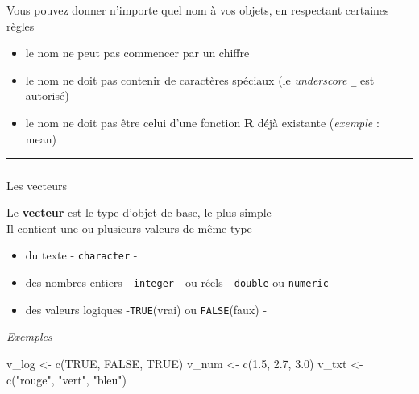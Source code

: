 \documentclass[
  french,
  10pt,
  a4paper,
]{article}
\makeatletter
\let\oldsubparagraph\subparagraph
\renewcommand{\subparagraph}{
    \@ifstar
      \xxxSubParagraphStar
      \xxxSubParagraphNoStar
  }
\newcommand{\xxxSubParagraphStar}[1]{\oldsubparagraph*{#1}\mbox{}}
\newcommand{\xxxSubParagraphNoStar}[1]{\oldsubparagraph{#1}\mbox{}}
\newenvironment{Shaded}{}{}
\newcommand{\ConstantTok}[1]{\textcolor[rgb]{0.60,0.41,0.00}{#1}}
\newcommand{\FloatTok}[1]{\textcolor[rgb]{0.60,0.41,0.00}{#1}}
\newcommand{\FunctionTok}[1]{\textcolor[rgb]{0.25,0.47,0.95}{#1}}
\newcommand{\NormalTok}[1]{\textcolor[rgb]{0.22,0.23,0.26}{#1}}
\newcommand{\OtherTok}[1]{\textcolor[rgb]{0.15,0.68,0.38}{#1}}
\newcommand{\StringTok}[1]{\textcolor[rgb]{0.31,0.63,0.31}{#1}}
\providecommand{\tightlist}{%
  \setlength{\itemsep}{0pt}\setlength{\parskip}{0pt}}
\makeatother
\begin{document}
\begin{tcolorbox}[enhanced jigsaw, arc=.35mm, bottomrule=.15mm, bottomtitle=1mm, breakable, colback=white, colbacktitle=quarto-callout-tip-color!10!white, colframe=quarto-callout-tip-color-frame, coltitle=black, left=2mm, leftrule=.75mm, opacityback=0, opacitybacktitle=0.6, rightrule=.15mm, title=\textcolor{quarto-callout-tip-color}{\faLightbulb}\hspace{0.5em}{Comment nommmer les objets ?}, titlerule=0mm, toprule=.15mm, toptitle=1mm]

Vous pouvez donner n'importe quel nom à vos objets, en respectant
certaines règles

\begin{itemize}
\tightlist
\item
  le nom ne peut pas commencer par un chiffre
\item
  le nom ne doit pas contenir de caractères spéciaux (le
  \emph{underscore} \texttt{\_} est autorisé)
\item
  le nom ne doit pas être celui d'une fonction \textbf{R} déjà existante
  (\emph{exemple} : mean)
\end{itemize}

\end{tcolorbox}

\begin{center}\rule{0.5\linewidth}{0.5pt}\end{center}

\subparagraph{Les vecteurs}\label{les-vecteurs}

Le \textbf{vecteur} est le type d'objet de base, le plus simple\\
Il contient une ou plusieurs valeurs de même type

\begin{itemize}
\tightlist
\item
  du texte - \texttt{character} -
\item
  des nombres entiers - \texttt{integer} - ou réels - \texttt{double} ou
  \texttt{numeric} -
\item
  des valeurs logiques -\texttt{TRUE}(vrai) ou \texttt{FALSE}(faux) -
\end{itemize}

\emph{Exemples}

\begin{Shaded}
\begin{Highlighting}[]
\NormalTok{v\_log }\OtherTok{\textless{}{-}} \FunctionTok{c}\NormalTok{(}\ConstantTok{TRUE}\NormalTok{, }\ConstantTok{FALSE}\NormalTok{, }\ConstantTok{TRUE}\NormalTok{)}
\NormalTok{v\_num }\OtherTok{\textless{}{-}} \FunctionTok{c}\NormalTok{(}\FloatTok{1.5}\NormalTok{, }\FloatTok{2.7}\NormalTok{, }\FloatTok{3.0}\NormalTok{)}
\NormalTok{v\_txt }\OtherTok{\textless{}{-}} \FunctionTok{c}\NormalTok{(}\StringTok{"rouge"}\NormalTok{, }\StringTok{"vert"}\NormalTok{, }\StringTok{"bleu"}\NormalTok{)}
\end{Highlighting}
\end{Shaded}
\end{document}
